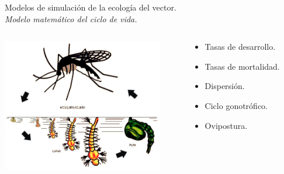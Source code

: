 \begin{frame}[t]{Modelos de simulación de la ecología del vector.\\\textit{Modelo matemático del ciclo de vida.}}
  \begin{center}
   \begin{columns}[t]
        \begin{column}[T]{7cm}
            \includegraphics[width=7cm]{./graphics/ciclo-de-vida.jpg}
        \end{column}
        \begin{column}[T]{4cm}
          \begin{itemize}
            \item Tasas de desarrollo.
            \item Tasas de mortalidad.
            \item Dispersión.
            \item Ciclo gonotrófico.
            \item Ovipostura.
          \end{itemize}
        \end{column}
    \end{columns}
  \end{center}
\end{frame}

